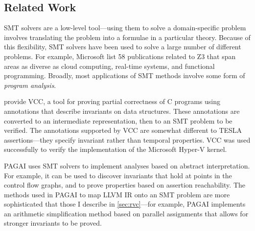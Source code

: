 \subsection{Related Work}

SMT solvers are a low-level tool---using them to solve a domain-specific
problem involves translating the problem into a formulae in a particular
theory. Because of this flexibility, SMT solvers have been used to solve
a large number of different problems. For example, Microsoft list 58
publications related to Z3\cite{_publications:_????} that span areas as
diverse as cloud computing, real-time systems, and functional
programming. Broadly, most applications of SMT methods involve some form
of \emph{program analysis}.

\textcite{dahlweid_vcc:_2009} provide VCC, a tool for proving partial
correctness of C programs using annotations that describe invariants on data
structures. These annotations are converted to an intermediate representation,
then to an SMT problem to be verified. The annotations supported by VCC are
somewhat different to TESLA assertions---they specify invariant rather than
temporal properties. VCC was used successfully to verify the implementation of
the Microsoft Hyper-V kernel.

% 


PAGAI \cite{henry_pagai:_2012} uses SMT solvers to implement analyses based on
abstract interpretation. For example, it can be used to discover invariants that
hold at points in the control flow graphs, and to prove properties based on
assertion reachability. The methods used in PAGAI to map LLVM IR onto an SMT
problem are more sophisticated that those I describe in \autoref{sec:rvc}---for
example, PAGAI implements an arithmetic simplification method based on parallel
assignments that allows for stronger invariants to be proved.
